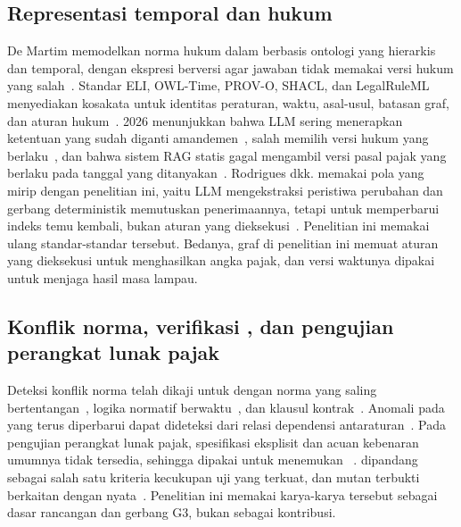 \subsection{Representasi temporal dan  hukum}
\label{subsec:kg-hukum}

De Martim memodelkan norma hukum dalam  berbasis ontologi yang hierarkis dan temporal, dengan ekspresi berversi agar jawaban tidak memakai versi hukum yang salah~\cite{demartim2025satgraph}. Standar ELI, OWL-Time, PROV-O, SHACL, dan LegalRuleML menyediakan kosakata untuk identitas peraturan, waktu, asal-usul, batasan graf, dan aturan hukum~\cite{publicationsoffice2026eli,cox2017owltime,lebo2013provo,knublauch2017shacl,palmirani2021legalruleml}.  2026 menunjukkan bahwa LLM sering menerapkan ketentuan yang sudah diganti amandemen~\cite{prior2026asking}, salah memilih versi hukum yang berlaku~\cite{huang2026wrong}, dan bahwa sistem RAG statis gagal mengambil versi pasal pajak yang berlaku pada tanggal yang ditanyakan~\cite{cymbler2026temporal}. Rodrigues dkk. memakai pola yang mirip dengan penelitian ini, yaitu LLM mengekstraksi peristiwa perubahan dan gerbang deterministik memutuskan penerimaannya, tetapi untuk memperbarui indeks temu kembali, bukan aturan yang dieksekusi~\cite{rodrigues2026retrieving}. Penelitian ini memakai ulang standar-standar tersebut. Bedanya, graf di penelitian ini memuat aturan yang dieksekusi untuk menghasilkan angka pajak, dan versi waktunya dipakai untuk menjaga hasil masa lampau.

\subsection{Konflik norma, verifikasi , dan pengujian perangkat lunak pajak}
\label{subsec:konflik-uji}

Deteksi konflik norma telah dikaji untuk  dengan norma yang saling bertentangan~\cite{robaldo2024compliance}, logika normatif berwaktu~\cite{kharraz2024conflicts}, dan klausul kontrak~\cite{khoja2026consistency}. Anomali pada  yang terus diperbarui dapat dideteksi dari relasi dependensi antaraturan~\cite{boujelben2025anomalies}. Pada pengujian perangkat lunak pajak, spesifikasi eksplisit dan acuan kebenaran umumnya tidak tersedia, sehingga  dipakai untuk menemukan ~\cite{tizpaz2023metamorphic,li2025mrgeneration}.  dipandang sebagai salah satu kriteria kecukupan uji yang terkuat, dan mutan terbukti berkaitan dengan  nyata~\cite{petrovic2021mutation,petrovic2022mutation}. Penelitian ini memakai karya-karya tersebut sebagai dasar rancangan  dan gerbang G3, bukan sebagai kontribusi.

